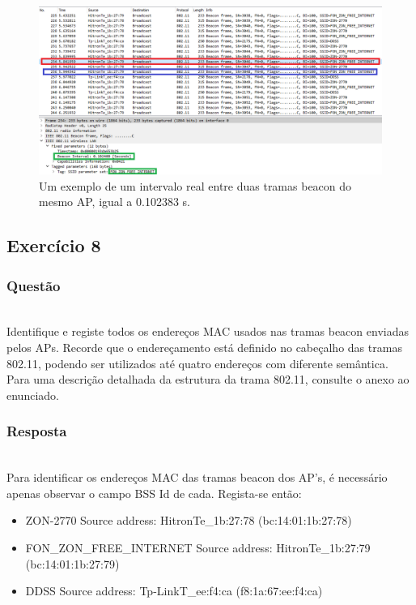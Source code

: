 \documentclass{llncs}
\begin{document}
\begin{figure}
  \begin{center}
  \includegraphics[scale=0.35]{imagens/FONZON_BI.png} 
  \end{center}
  \caption{Um exemplo de um intervalo real entre duas tramas beacon do mesmo AP, igual a 0.102383 s.}
  \label{fig:fonzon_interval}
\end{figure}


\clearpage
\subsection{Exercício 8}
\subsubsection{Questão}\rule[-10pt]{0pt}{10pt}\\

Identifique e registe todos os endereços MAC usados nas tramas beacon enviadas pelos APs. Recorde que o endereçamento está definido no cabeçalho das tramas 802.11, podendo ser utilizados até quatro endereços com diferente semântica. Para uma descrição detalhada da estrutura da trama 802.11, consulte o anexo ao enunciado.

\subsubsection{Resposta}\rule[-10pt]{0pt}{10pt}\\

Para identificar os endereços MAC das tramas beacon dos AP's, é necessário apenas observar o campo BSS Id de cada. Regista-se então:
\begin{itemize}
  \item ZON-2770 Source address: HitronTe\_1b:27:78 (bc:14:01:1b:27:78)
  \item FON\_ZON\_FREE\_INTERNET Source address: HitronTe\_1b:27:79 (bc:14:01:1b:27:79)
  \item DDSS Source address: Tp-LinkT\_ee:f4:ca (f8:1a:67:ee:f4:ca)
\end{itemize}
\end{document}
